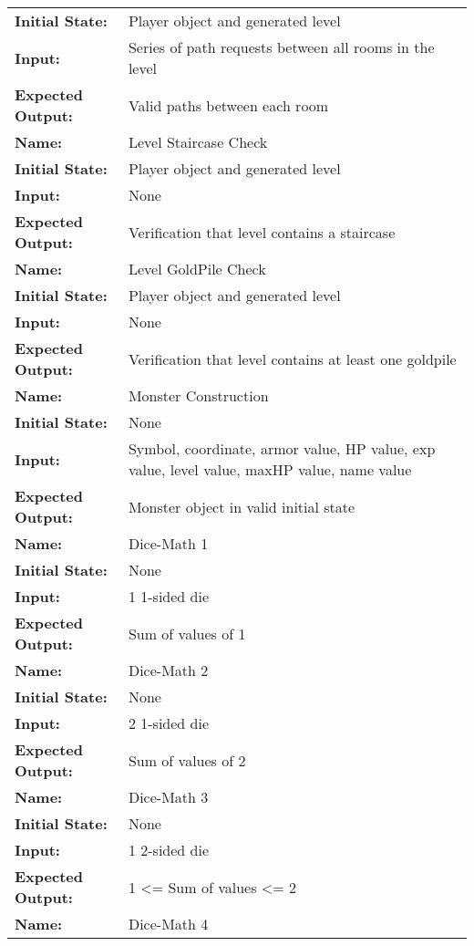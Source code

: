 \documentclass[12pt, titlepage]{article}
\begin{document}
\begin{center}
\begin{longtable}{ l | p{10cm} }
				\textbf{Initial State:} & Player object and generated level\\
				\textbf{Input:} & Series of path requests between all rooms in the level\\
				\textbf{Expected Output:} & Valid paths between each room\\
				\hline
				\textbf{Name:} & Level Staircase Check\\
				\textbf{Initial State:} & Player object and generated level\\
				\textbf{Input:} & None\\
				\textbf{Expected Output:} & Verification that level contains a staircase\\
				\hline
				\textbf{Name:} & Level GoldPile Check\\
				\textbf{Initial State:} & Player object and generated level\\
				\textbf{Input:} & None\\
				\textbf{Expected Output:} & Verification that level contains at least one goldpile\\
				\hline
				\textbf{Name:} & Monster Construction\\
				\textbf{Initial State:} & None\\
				\textbf{Input:} & Symbol, coordinate, armor value, HP value, exp value, level value, maxHP value, name value\\
				\textbf{Expected Output:} & Monster object in valid initial state\\
				\hline
				\textbf{Name:} & Dice-Math 1\\
				\textbf{Initial State:} & None\\
				\textbf{Input:} & 1 1-sided die\\
				\textbf{Expected Output:} & Sum of values of 1\\
				\hline
				\textbf{Name:} & Dice-Math 2\\
				\textbf{Initial State:} & None\\
				\textbf{Input:} & 2 1-sided die\\
				\textbf{Expected Output:} & Sum of values of 2\\
				\hline
				\textbf{Name:} & Dice-Math 3\\
				\textbf{Initial State:} & None\\
				\textbf{Input:} & 1 2-sided die\\
				\textbf{Expected Output:} & 1 <= Sum of values <= 2\\
				\hline
				\textbf{Name:} & Dice-Math 4\\

\end{longtable}
\end{center}
\end{document}
